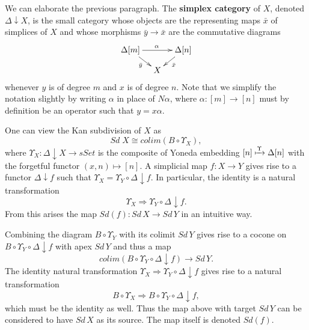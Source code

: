 We can elaborate the previous paragraph. The \textbf{simplex category} of $X$, denoted $\Delta \downarrow X$, is the small category whose objects are the representing maps $\bar{x}$ of simplices of $X$ and whose morphisms $\bar{y} \to \bar{x}$ are the commutative diagrams
\begin{displaymath}
\xymatrix@=1em{
\Delta [m] \ar[dr]_{\bar{y} } \ar[rr]^{\alpha } && \Delta [n] \ar[ld]^{\bar{x} } \\
& X
}
\end{displaymath}
whenever $y$ is of degree $m$ and $x$ is of degree $n$. Note that we simplify the notation slightly by writing $\alpha$ in place of $N\alpha$, where $\alpha :[m]\to [n]$ must by definition be an operator such that $y=x\alpha$.

One can view the Kan subdivision of $X$ as
\[Sd\; X\cong colim(B\circ \Upsilon _X),\]
where $\Upsilon _X:\Delta \downarrow X\to sSet$ is the composite of Yoneda embedding $[n]\xmapsto{\Upsilon } \Delta [n]$ with the forgetful functor $(x,n)\mapsto [n]$. A simplicial map $f:X\to Y$ gives rise to a functor $\Delta \downarrow f$ such that $\Upsilon _X=\Upsilon _Y\circ \Delta \downarrow f$. In particular, the identity is a natural transformation
\[\Upsilon _X\Rightarrow\Upsilon _Y\circ \Delta \downarrow f.\]
From this arises the map $Sd(f):Sd\, X\to Sd\, Y$ in an intuitive way.

Combining the diagram $B\circ \Upsilon _Y$ with its colimit $Sd\, Y$ gives rise to a cocone on $B\circ \Upsilon _Y\circ \Delta \downarrow f$ with apex $Sd\, Y$ and thus a map
\[colim(B\circ \Upsilon _Y\circ \Delta \downarrow f)\to Sd\, Y.\]
The identity natural transformation $\Upsilon _X\Rightarrow\Upsilon _Y\circ \Delta \downarrow f$ gives rise to a natural transformation
\[B\circ \Upsilon _X\Rightarrow B\circ \Upsilon _Y\circ \Delta \downarrow f,\]
which must be the identity as well. Thus the map above with target $Sd\, Y$ can be considered to have $Sd\, X$ as its source. The map itself is denoted $Sd(f)$.

